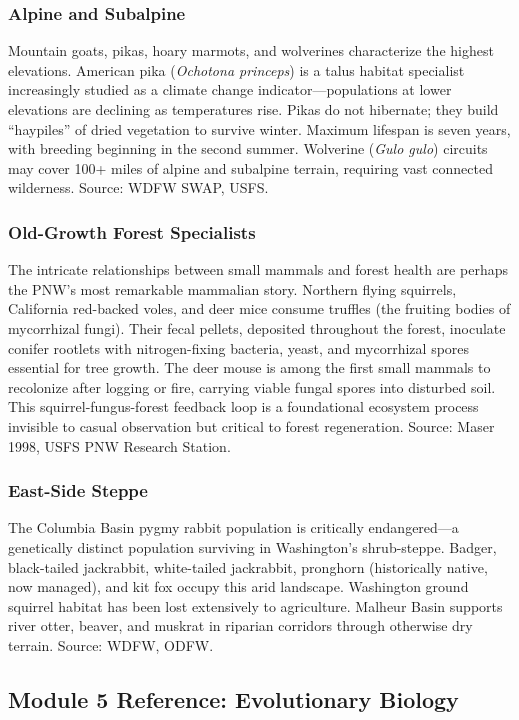 \documentclass[11pt,letterpaper]{article}
\begin{document}
\subsubsection{Alpine and Subalpine}
Mountain goats, pikas, hoary marmots, and wolverines characterize the highest elevations. American pika (\textit{Ochotona princeps}) is a talus habitat specialist increasingly studied as a climate change indicator---populations at lower elevations are declining as temperatures rise. Pikas do not hibernate; they build ``haypiles'' of dried vegetation to survive winter. Maximum lifespan is seven years, with breeding beginning in the second summer. Wolverine (\textit{Gulo gulo}) circuits may cover 100+ miles of alpine and subalpine terrain, requiring vast connected wilderness. Source: WDFW SWAP, USFS.

\subsubsection{Old-Growth Forest Specialists}
The intricate relationships between small mammals and forest health are perhaps the PNW's most remarkable mammalian story. Northern flying squirrels, California red-backed voles, and deer mice consume truffles (the fruiting bodies of mycorrhizal fungi). Their fecal pellets, deposited throughout the forest, inoculate conifer rootlets with nitrogen-fixing bacteria, yeast, and mycorrhizal spores essential for tree growth. The deer mouse is among the first small mammals to recolonize after logging or fire, carrying viable fungal spores into disturbed soil. This squirrel-fungus-forest feedback loop is a foundational ecosystem process invisible to casual observation but critical to forest regeneration. Source: Maser 1998, USFS PNW Research Station.

\subsubsection{East-Side Steppe}
The Columbia Basin pygmy rabbit population is critically endangered---a genetically distinct population surviving in Washington's shrub-steppe. Badger, black-tailed jackrabbit, white-tailed jackrabbit, pronghorn (historically native, now managed), and kit fox occupy this arid landscape. Washington ground squirrel habitat has been lost extensively to agriculture. Malheur Basin supports river otter, beaver, and muskrat in riparian corridors through otherwise dry terrain. Source: WDFW, ODFW.

\subsection{Module 5 Reference: Evolutionary Biology}
\end{document}
